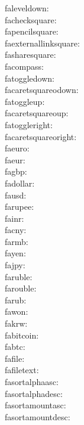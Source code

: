 faleveldown: {\FA \faleveldown} \\
fachecksquare: {\FA \fachecksquare} \\
fapencilsquare: {\FA \fapencilsquare} \\
faexternallinksquare: {\FA \faexternallinksquare} \\
fasharesquare: {\FA \fasharesquare} \\
facompass: {\FA \facompass} \\
fatoggledown: {\FA \fatoggledown} \\
facaretsquareodown: {\FA \facaretsquareodown} \\
fatoggleup: {\FA \fatoggleup} \\
facaretsquareoup: {\FA \facaretsquareoup} \\
fatoggleright: {\FA \fatoggleright} \\
facaretsquareoright: {\FA \facaretsquareoright} \\
faeuro: {\FA \faeuro} \\
faeur: {\FA \faeur} \\
fagbp: {\FA \fagbp} \\
fadollar: {\FA \fadollar} \\
fausd: {\FA \fausd} \\
farupee: {\FA \farupee} \\
fainr: {\FA \fainr} \\
facny: {\FA \facny} \\
farmb: {\FA \farmb} \\
fayen: {\FA \fayen} \\
fajpy: {\FA \fajpy} \\
faruble: {\FA \faruble} \\
farouble: {\FA \farouble} \\
farub: {\FA \farub} \\
fawon: {\FA \fawon} \\
fakrw: {\FA \fakrw} \\
fabitcoin: {\FA \fabitcoin} \\
fabtc: {\FA \fabtc} \\
fafile: {\FA \fafile} \\
fafiletext: {\FA \fafiletext} \\
fasortalphaasc: {\FA \fasortalphaasc} \\
fasortalphadesc: {\FA \fasortalphadesc} \\
fasortamountasc: {\FA \fasortamountasc} \\
fasortamountdesc: {\FA \fasortamountdesc} \\
